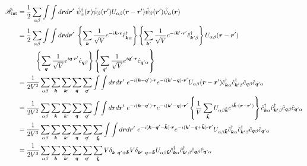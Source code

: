 \documentclass[dvipdfmx, 11pt, a4paper]{jsarticle}
\theoremstyle{definition}
\numberwithin{equation}{section}
\begin{document}
    \begin{derivationBox}
        \begin{align}
            \hat{\mathscr{H}}_{\text{int}} &= \frac{1}{2} \sum_{\alpha \beta}\int \int d\bm{r}d\bm{r}'\ \hat{\psi}^\dagger_{\alpha} (\bm{r})\hat{\psi}_{\beta}(\bm{r}') U_{\alpha\beta}(\bm{r}-\bm{r}')\hat{\psi}_{\beta}(\bm{r}')\hat{\psi}_{\alpha}(\bm{r}) \notag \\
            &= \frac{1}{2} \sum_{\alpha \beta}\int \int d\bm{r}d\bm{r}'\ \left\{ \sum_{\bm{k}}\frac{1}{\sqrt{V}} e^{-i\bm{k}\cdot \bm{r}} \hat{c}^\dagger_{\bm{k}\alpha} \right\}\left\{ \sum_{\bm{k}'}\frac{1}{\sqrt{V}} e^{-i\bm{k}'\cdot \bm{r}'} \hat{c}^\dagger_{\bm{k}'\beta} \right\} U_{\alpha\beta}(\bm{r}-\bm{r}')\notag \\\
            &\ \ \ \ \ \ \ \ \left\{ \sum_{\bm{q}}\frac{1}{\sqrt{V}} e^{i\bm{q}\cdot \bm{r}'} \hat{c}_{\bm{q}\beta} \right\}\left\{ \sum_{\bm{q}'}\frac{1}{\sqrt{V}} e^{i\bm{q}'\cdot \bm{r}} \hat{c}_{\bm{q}'\alpha} \right\} \notag \\
            &= \frac{1}{2V^2} \sum_{\alpha \beta} \sum_{\bm{k}}\sum_{\bm{k}'}\sum_{\bm{q}}\sum_{\bm{q}'}\int \int d\bm{r}d\bm{r}'\   e^{-i(\bm{k}-\bm{q}')\cdot \bm{r}}   e^{-i(\bm{k}'-\bm{q})\cdot \bm{r}'}  U_{\alpha\beta}(\bm{r}-\bm{r}') \hat{c}^\dagger_{\bm{k}\alpha}\hat{c}^\dagger_{\bm{k}'\beta}\hat{c}_{\bm{q}\beta} \hat{c}_{\bm{q}'\alpha}\notag \\
            &= \frac{1}{2V^2} \sum_{\alpha \beta} \sum_{\bm{k}}\sum_{\bm{k}'}\sum_{\bm{q}}\sum_{\bm{q}'}\int \int d\bm{r}d\bm{r}'\   e^{-i(\bm{k}-\bm{q}')\cdot \bm{r}}   e^{-i(\bm{k}'-\bm{q})\cdot \bm{r}'}  \left\{ \frac{1}{V}\sum_{\bm{\tilde{k}}} U_{\alpha \beta\bm{\tilde{k}}}e^{i\bm{\tilde{k}}\cdot(\bm{r}-\bm{r}')}\right\}\hat{c}^\dagger_{\bm{k}\alpha}\hat{c}^\dagger_{\bm{k}'\beta}\hat{c}_{\bm{q}\beta} \hat{c}_{\bm{q}'\alpha}\notag \\
            &= \frac{1}{2V^3} \sum_{\alpha \beta} \sum_{\bm{k}}\sum_{\bm{k}'}\sum_{\bm{q}}\sum_{\bm{q}'}\sum_{\bm{\tilde{k}}}\int \int d\bm{r}d\bm{r}'\   e^{-i(\bm{k}-\bm{q}'-\bm{\tilde{k}})\cdot \bm{r}}   e^{-i(\bm{k}'-\bm{q}+\bm{\tilde{k}})\cdot \bm{r}'}   U_{\alpha \beta\bm{\tilde{k}}}\hat{c}^\dagger_{\bm{k}\alpha}\hat{c}^\dagger_{\bm{k}'\beta}\hat{c}_{\bm{q}\beta} \hat{c}_{\bm{q}'\alpha}\notag \\
            &= \frac{1}{2V^3} \sum_{\alpha \beta} \sum_{\bm{k}}\sum_{\bm{k}'}\sum_{\bm{q}}\sum_{\bm{q}'}\sum_{\bm{\tilde{k}}}   V\delta_{\bm{k}\ \bm{q}'+\bm{\tilde{k}}}   V\delta_{\bm{k}'\ \bm{q}-\bm{\tilde{k}}}   U_{\alpha \beta\bm{\tilde{k}}}\hat{c}^\dagger_{\bm{k}\alpha}\hat{c}^\dagger_{\bm{k}'\beta}\hat{c}_{\bm{q}\beta} \hat{c}_{\bm{q}'\alpha}\notag \\

\end{align}
\end{derivationBox}
\end{document}
